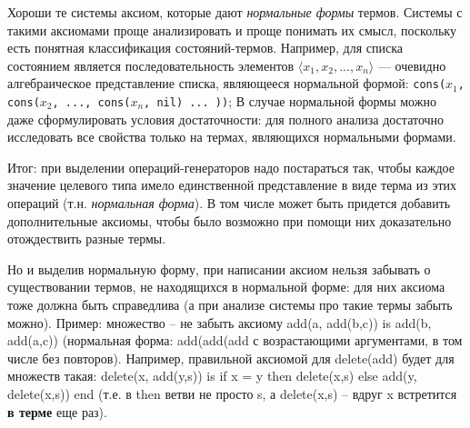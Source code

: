 Хороши те системы аксиом, которые дают \emph{нормальные формы} термов. Системы с такими аксиомами проще анализировать и проще понимать их смысл, поскольку есть понятная классификация состояний-термов. Например, для списка состоянием является последовательность элементов $\langle x_1, x_2, ..., x_n \rangle$ --- очевидно алгебраическое представление списка, являющееся нормальной формой: \texttt{cons($x_1$, cons($x_2$, ..., cons($x_n$, nil) ... ))}; В случае нормальной формы можно даже сформулировать условия достаточности: для полного анализа достаточно исследовать все свойства только на термах, являющихся нормальными формами.

Итог: при выделении операций-генераторов надо постараться так, чтобы каждое значение целевого типа имело единственной представление в виде терма из этих операций (т.н. \emph{нормальная форма}). В том числе может быть придется добавить дополнительные аксиомы, чтобы было возможно при помощи них доказательно отождествить разные термы.

Но и выделив нормальную форму, при написании аксиом нельзя забывать о существовании термов, не находящихся в нормальной форме: для них аксиома тоже должна быть справедлива (а при анализе системы про такие термы забыть можно). Пример: множество -- не забыть аксиому add(a, add(b,c)) is add(b, add(a,c))   (нормальная форма: add(add(add с возрастающими аргументами, в том числе без повторов). Например, правильной аксиомой для delete(add) будет для множеств такая: delete(x, add(y,s)) is if x = y then delete(x,s) else add(y, delete(x,s)) end (т.е. в then ветви не просто s, а delete(x,s) -- вдруг x встретится \textbf{в терме} еще раз).

